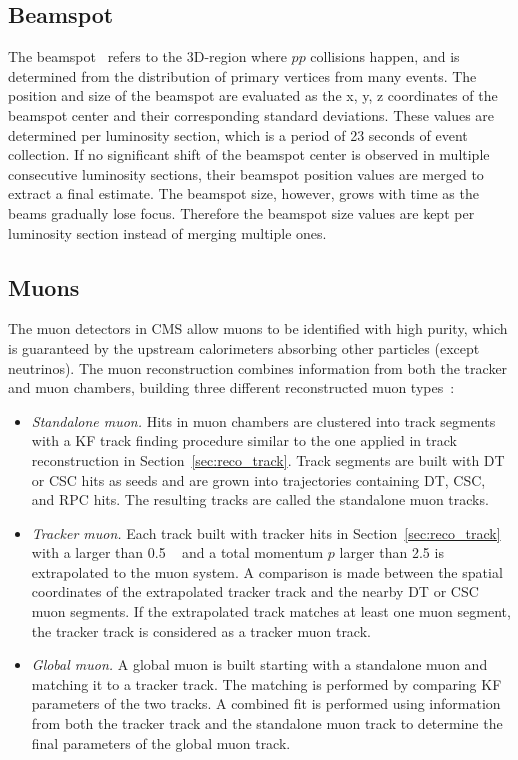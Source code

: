 \subsection{Beamspot}\label{sec:reco_bs}
The beamspot~\cite{Collaboration_2014} refers to the 3D-region where $pp$ collisions happen, 
and is determined from the distribution of primary vertices from many events.
The position and size of the beamspot are evaluated as the x, y, z coordinates 
of the beamspot center and their corresponding standard deviations.
These values are determined per luminosity section, which is a period of 23 seconds of event collection.
If no significant shift of the beamspot center is observed in multiple consecutive luminosity sections,
their beamspot position values are merged to extract a final estimate.
The beamspot size, however, grows with time as the beams gradually lose focus. 
Therefore the beamspot size values are kept per luminosity section instead of merging multiple ones. 

\subsection{Muons}\label{sec:reco_muon}

The muon detectors in CMS allow muons to be identified with high purity,
which is guaranteed by the upstream calorimeters absorbing other particles (except neutrinos).
The muon reconstruction combines information from both the tracker and muon chambers, 
building three different reconstructed muon types~\cite{Sirunyan_2018}:
\begin{itemize}
      \item \textit{Standalone muon.} 
            Hits in muon chambers are clustered into track segments with a KF track finding procedure
            similar to the one applied in track reconstruction in Section~\ref{sec:reco_track}.
            Track segments are built with DT or CSC hits as seeds and are grown into trajectories containing DT, CSC, and RPC hits. 
            The resulting tracks are called the standalone muon tracks.
      \item \textit{Tracker muon.}
            Each track built with tracker hits in Section~\ref{sec:reco_track} with a \pt larger than 0.5 ~\GeV 
            and a total momentum $p$ larger than 2.5 \GeV is extrapolated to the muon system.
            A comparison is made between the spatial coordinates of the extrapolated tracker track and the nearby DT or CSC muon segments.
            If the extrapolated track matches at least one muon segment,
            the tracker track is considered as a tracker muon track.
      \item \textit{Global muon.}
            A global muon is built starting with a standalone muon and matching it to a tracker track.
            The matching is performed by comparing KF parameters of the two tracks.
            A combined fit is performed using information from both the tracker track and the standalone muon track
            to determine the final parameters of the global muon track. 
\end{itemize}

